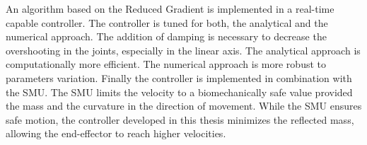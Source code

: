 An algorithm based on the Reduced  Gradient is implemented in a real-time capable controller. The controller is tuned for both, the analytical and the numerical approach. The addition of damping is necessary to decrease the overshooting in the joints, especially in the linear axis. The analytical approach is  computationally more efficient. The numerical approach is more robust to parameters variation.
Finally the controller is implemented in combination with the SMU. The SMU limits the velocity to a biomechanically safe value provided the mass and the curvature in the direction of movement. While the SMU ensures safe motion, the controller developed in this thesis minimizes the reflected mass, allowing the end-effector to reach higher velocities. 



%
%






